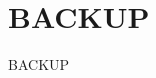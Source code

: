 \documentclass[usenames,dvipsnames]{beamer}
\begin{document}
\appendix
\section{BACKUP}
\begin{frame}
\begin{center}
\LARGE
BACKUP
\end{center}
\end{frame}

\begin{frame}
\tableofcontents
\end{frame}










\end{document}
